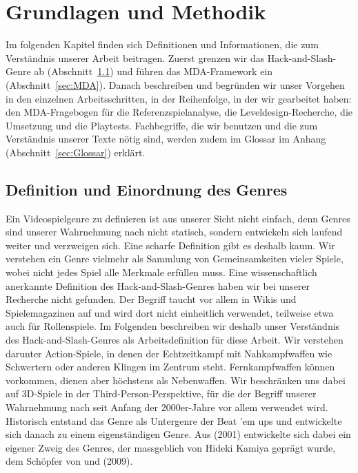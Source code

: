 \documentclass[../Main.tex]{subfiles}
\begin{document}
\section{Grundlagen und Methodik} \label{sec:Grundlagen}
Im folgenden Kapitel finden sich Definitionen und Informationen, die zum Verständnis unserer Arbeit beitragen. Zuerst grenzen wir das Hack-and-Slash-Genre ab (Abschnitt~\ref{sec:Genredefinition}) und führen das MDA-Framework ein (Abschnitt~\ref{sec:MDA}). Danach beschreiben und begründen wir unser Vorgehen in den einzelnen Arbeitsschritten, in der Reihenfolge, in der wir gearbeitet haben: den MDA-Fragebogen für die Referenzspielanalyse, die Leveldesign-Recherche, die Umsetzung und die Playtests. Fachbegriffe, die wir benutzen und die zum Verständnis unserer Texte nötig sind, werden zudem im Glossar im Anhang (Abschnitt~\ref{sec:Glossar}) erklärt.

\subsection{Definition und Einordnung des Genres} \label{sec:Genredefinition}
Ein Videospielgenre zu definieren ist aus unserer Sicht nicht einfach, denn Genres sind unserer Wahrnehmung nach nicht statisch, sondern entwickeln sich laufend weiter und verzweigen sich. Eine scharfe Definition gibt es deshalb kaum. Wir verstehen ein Genre vielmehr als Sammlung von Gemeinsamkeiten vieler Spiele, wobei nicht jedes Spiel alle Merkmale erfüllen muss. Eine wissenschaftlich anerkannte Definition des Hack-and-Slash-Genres haben wir bei unserer Recherche nicht gefunden. Der Begriff taucht vor allem in Wikis und Spielemagazinen auf und wird dort nicht einheitlich verwendet, teilweise etwa auch für Rollenspiele.\autocite{wikipedia_hackandslash} Im Folgenden beschreiben wir deshalb unser Verständnis des Hack-and-Slash-Genres als Arbeitsdefinition für diese Arbeit. Wir verstehen darunter Action-Spiele, in denen der Echtzeitkampf mit Nahkampfwaffen wie Schwertern oder anderen Klingen im Zentrum steht. Fernkampfwaffen können vorkommen, dienen aber höchstens als Nebenwaffen. Wir beschränken uns dabei auf 3D-Spiele in der Third-Person-Perspektive, für die der Begriff unserer Wahrnehmung nach seit Anfang der 2000er-Jahre vor allem verwendet wird. Historisch entstand das Genre als Untergenre der Beat 'em ups und entwickelte sich danach zu einem eigenständigen Genre.\autocite{wikipedia_hackandslash} Aus  (2001)\autocite{capcom_devilmaycry_2001} entwickelte sich dabei ein eigener Zweig des Genres, der massgeblich von Hideki Kamiya geprägt wurde, dem Schöpfer von  und  (2009)\autocite{platinumgames_bayonetta_2009}.\autocite{wikipedia_hackandslash}
\end{document}
